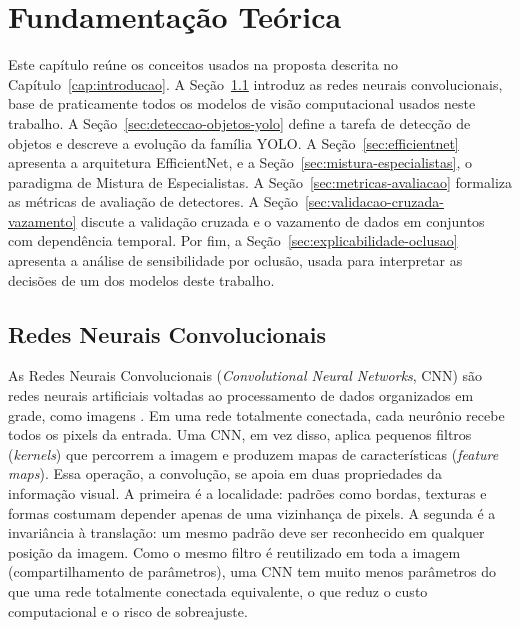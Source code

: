 %
%
%
\chapter{Fundamentação Teórica}
\label{cap:fundamentacao}

Este capítulo reúne os conceitos usados na proposta descrita no Capítulo~\ref{cap:introducao}. A Seção~\ref{sec:redes-neurais-convolucionais} introduz as redes neurais convolucionais, base de praticamente todos os modelos de visão computacional usados neste trabalho. A Seção~\ref{sec:deteccao-objetos-yolo} define a tarefa de detecção de objetos e descreve a evolução da família YOLO. A Seção~\ref{sec:efficientnet} apresenta a arquitetura EfficientNet, e a Seção~\ref{sec:mistura-especialistas}, o paradigma de Mistura de Especialistas. A Seção~\ref{sec:metricas-avaliacao} formaliza as métricas de avaliação de detectores. A Seção~\ref{sec:validacao-cruzada-vazamento} discute a validação cruzada e o vazamento de dados em conjuntos com dependência temporal. Por fim, a Seção~\ref{sec:explicabilidade-oclusao} apresenta a análise de sensibilidade por oclusão, usada para interpretar as decisões de um dos modelos deste trabalho.

\section{Redes Neurais Convolucionais}
\label{sec:redes-neurais-convolucionais}

As Redes Neurais Convolucionais (\textit{Convolutional Neural Networks}, CNN) são redes neurais artificiais voltadas ao processamento de dados organizados em grade, como imagens \cite{lecun1998gradient}. Em uma rede totalmente conectada, cada neurônio recebe todos os pixels da entrada. Uma CNN, em vez disso, aplica pequenos filtros (\textit{kernels}) que percorrem a imagem e produzem mapas de características (\textit{feature maps}). Essa operação, a convolução, se apoia em duas propriedades da informação visual. A primeira é a localidade: padrões como bordas, texturas e formas costumam depender apenas de uma vizinhança de pixels. A segunda é a invariância à translação: um mesmo padrão deve ser reconhecido em qualquer posição da imagem. Como o mesmo filtro é reutilizado em toda a imagem (compartilhamento de parâmetros), uma CNN tem muito menos parâmetros do que uma rede totalmente conectada equivalente, o que reduz o custo computacional e o risco de sobreajuste.

